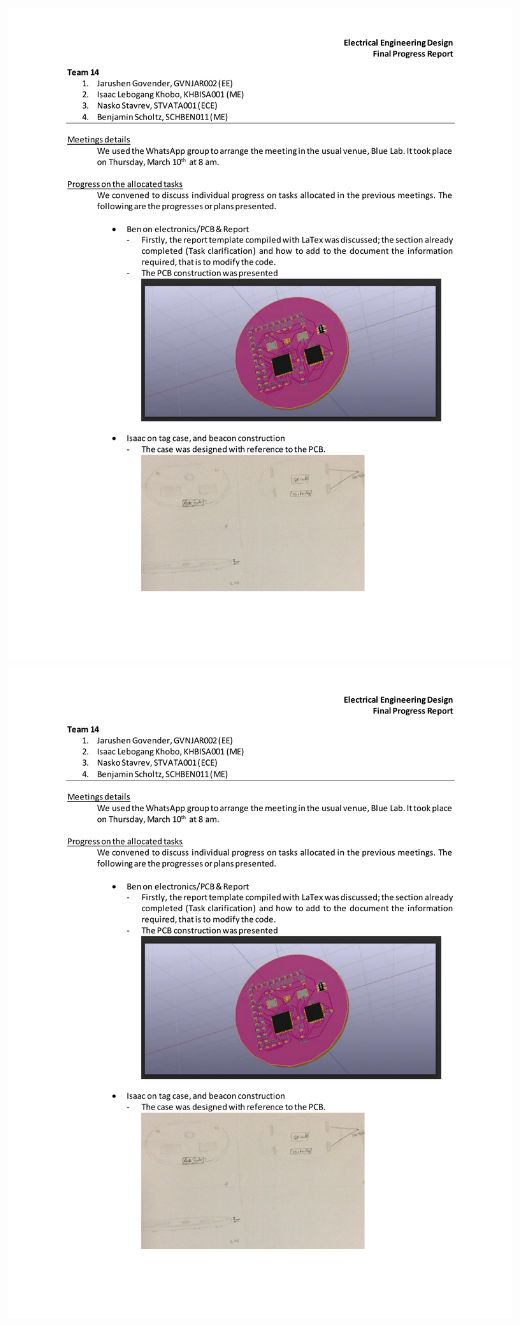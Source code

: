 \includegraphics[page=2,scale=0.9]{meeting/report4-isaac.pdf}
\includegraphics[page=3,scale=0.9]{meeting/report4-isaac.pdf}


